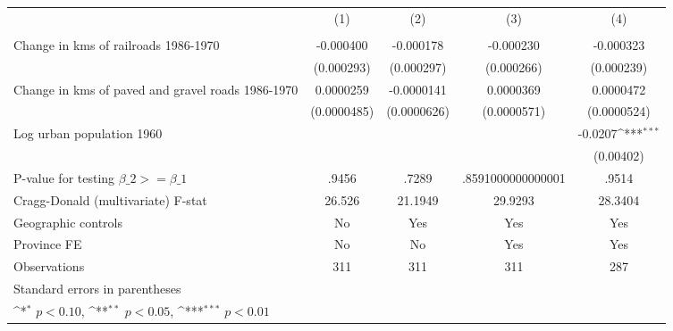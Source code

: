 {
\def\sym#1{\ifmmode^{#1}\else\(^{#1}\)\fi}
\begin{tabular}{l*{4}{c}}
\hline\hline
                &\multicolumn{1}{c}{(1)}&\multicolumn{1}{c}{(2)}&\multicolumn{1}{c}{(3)}&\multicolumn{1}{c}{(4)}\\
                &\multicolumn{1}{c}{}&\multicolumn{1}{c}{}&\multicolumn{1}{c}{}&\multicolumn{1}{c}{}\\
\hline
Change in kms of railroads 1986-1970&-0.000400         &-0.000178         &-0.000230         &-0.000323         \\
                &(0.000293)         &(0.000297)         &(0.000266)         &(0.000239)         \\
[1em]
Change in kms of paved and gravel roads 1986-1970&0.0000259         &-0.0000141         &0.0000369         &0.0000472         \\
                &(0.0000485)         &(0.0000626)         &(0.0000571)         &(0.0000524)         \\
[1em]
Log urban population 1960&                  &                  &                  &  -0.0207\sym{***}\\
                &                  &                  &                  &(0.00402)         \\
\hline
P-value for testing $\beta\_{2} >= \beta\_{1}$&    .9456         &    .7289         &.8591000000000001         &    .9514         \\
Cragg-Donald (multivariate) F-stat&   26.526         &  21.1949         &  29.9293         &  28.3404         \\
Geographic controls&       No         &      Yes         &      Yes         &      Yes         \\
Province FE     &       No         &       No         &      Yes         &      Yes         \\
Observations    &      311         &      311         &      311         &      287         \\
\hline\hline
\multicolumn{5}{l}{\footnotesize Standard errors in parentheses}\\
\multicolumn{5}{l}{\footnotesize \sym{*} \(p<0.10\), \sym{**} \(p<0.05\), \sym{***} \(p<0.01\)}\\
\end{tabular}
}
